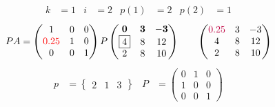 \documentclass[pdf]{beamer}
\begin{document}
\begin{frame}{}\begin{align*} k &= 1 & i &= 2 & p(1) &= 2 & p(2) &= 1\end{align*}$$PA=\begin{pmatrix}1&0&0\\{\color{red}0.25}&1&0\\0&0&1\end{pmatrix} P \begin{pmatrix}\mathbf{0}&\mathbf{3}&\mathbf{-3}\\\boxed{4}&8&12\\2&8&10\end{pmatrix} \quad\quad \begin{pmatrix}{\color{purple}0.25}&3&-3\\4&8&12\\2&8&10\end{pmatrix}$$\begin{align*} p&= \begin{Bmatrix}2&1&3\end{Bmatrix} & P&= \begin{pmatrix}0&1&0\\1&0&0\\0&0&1\end{pmatrix} \end{align*}\end{frame}
\end{document}
